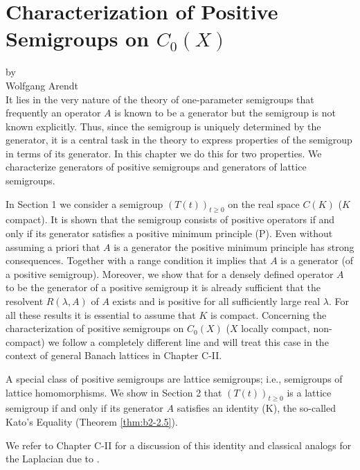 \setcounter{chapter}{1}
\chapter{Characterization of Positive Semigroups on \texorpdfstring{$C_{0}(X)$}{C(X)}}
\label{chap:b2}%
{\Large
\vspace*{-.75cm}
by \\[.25em]
Wolfgang Arendt 
\vspace{.75cm}
\\
}
It lies in the very nature of the theory of one-parameter semigroups that frequently an operator $A$ is known to be a generator but the semigroup is not known explicitly.
Thus, since the semigroup is uniquely determined by the generator, it is a central task in the theory to express properties of the semigroup in terms of its generator.
In this chapter we do this for two properties.
We characterize generators of positive semigroups and generators of lattice semigroups.

In Section 1 we consider a semigroup $(T(t))_{t \geq 0}$ on the real space $C(K)$ ($K$ compact).
It is shown that the semigroup consists of positive operators if and only if its generator satisfies a positive minimum principle (P).
Even without assuming a priori that $A$ is a generator the positive minimum principle has strong consequences.
Together with a range condition it implies that $A$ is a generator (of a positive semigroup).
Moreover, we show that for a densely defined operator $A$ to be the generator of a positive semigroup it is already sufficient that the resolvent $R(\lambda,A)$ of $A$ exists and is positive for all sufficiently large real $\lambda$.
For all these results it is essential to assume that $K$ is compact.
Concerning the characterization of positive semigroups on $C_{0}(X)$ ($X$ locally compact, non-compact) we follow a completely different line and will treat this case in the context of general Banach lattices in Chapter C-II.

A special class of positive semigroups are lattice semigroups; i.e., semigroups of lattice homomorphisms.
We show in Section 2 that $(T(t))_{t \geq 0}$ is a lattice semigroup if and only if its generator $A$ satisfies an identity (K), the so-called Kato's Equality (Theorem \ref{thm:b2-2.5}).

We refer to Chapter C-II for a discussion of this identity and classical analogs for the Laplacian due to \citet{kato:1973}.

